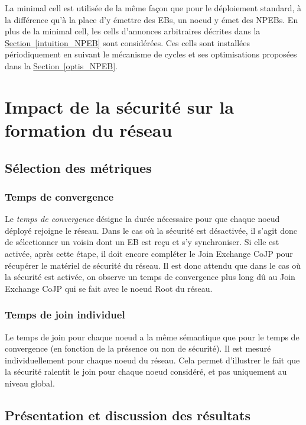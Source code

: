 \documentclass[]{report}
\newcommand{\wordlink}[2]{\hyperref[#2]{#1~\ref{#2}}}
\begin{document}
\vspace{0.3cm}

La minimal cell est utilisée de la même façon que pour le déploiement standard, à la différence qu'à la place d'y émettre des EBs, un noeud y émet des NPEBs. En plus de la minimal cell, les cells d'annonces arbitraires décrites dans la \wordlink{Section}{intuition_NPEB} sont considérées. Ces cells sont installées périodiquement en suivant le mécanisme de cycles et ses optimisations proposées dans la \wordlink{Section}{optis_NPEB}.

\newpage

\section{Impact de la sécurité sur la formation du réseau}
\label{impact_secjoin}

\subsection{Sélection des métriques}

\subsubsection{Temps de convergence}

Le \textit{temps de convergence} désigne la durée nécessaire pour que chaque noeud déployé  rejoigne le réseau. Dans le cas où la sécurité est désactivée, il s'agit donc de sélectionner un voisin dont un EB est reçu et s'y synchroniser. Si elle est activée, après cette étape, il doit encore compléter le Join Exchange CoJP pour récupérer le matériel de sécurité du réseau. Il est donc attendu que dans le cas où la sécurité est activée, on observe un temps de convergence plus long dû au Join Exchange CoJP qui se fait avec le noeud Root du réseau.

\subsubsection{Temps de join individuel}

Le temps de join pour chaque noeud a la même sémantique que pour le temps de convergence (en fonction de la présence ou non de sécurité). Il est mesuré individuellement pour chaque noeud du réseau. Cela permet d'illustrer le fait que la sécurité ralentit le join pour chaque noeud considéré, et pas uniquement au niveau global.

\subsection{Présentation et discussion des résultats}
\end{document}
